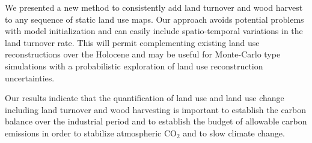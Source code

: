 We presented a new method to consistently add land turnover and wood harvest to any sequence of static land use maps. Our approach avoids potential problems with model initialization and can easily include spatio-temporal variations in the land turnover rate. This will permit complementing existing land use reconstructions over the Holocene \citep{kleingoldewijk2011geb, kaplan11, pongratz09} and may be useful for Monte-Carlo type simulations with a probabilistic exploration of land use reconstruction uncertainties.

Our results indicate that the quantification of land use and land use change including land turnover and wood harvesting is important to establish the carbon balance over the industrial period and to establish the budget of allowable carbon emissions in order to stabilize atmospheric CO$_2$ and to slow climate change.  


%





\clearpage






